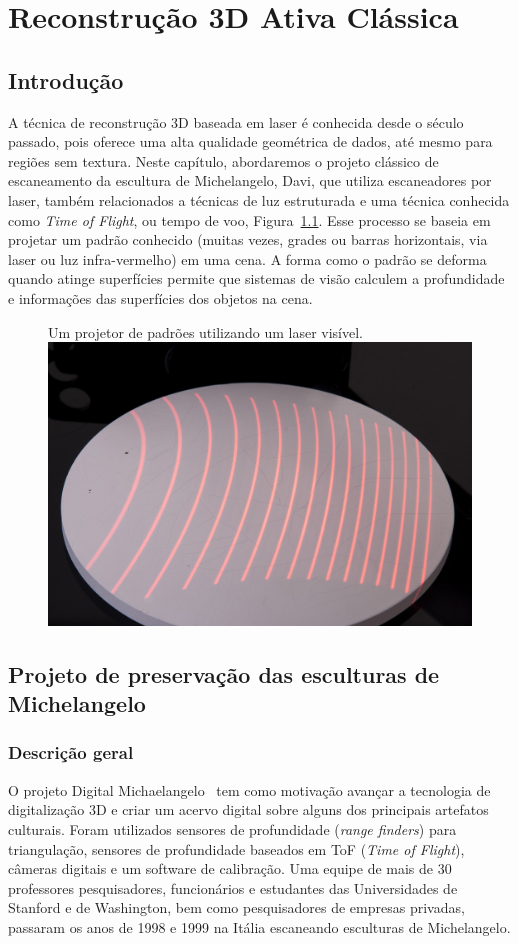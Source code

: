 \chapter{Reconstrução 3D Ativa Clássica}\label{cap:laser}

\section{Introdução}

A técnica de reconstrução 3D baseada em laser 
é conhecida desde o século
passado, pois oferece uma alta qualidade geométrica de dados, até mesmo para
regiões sem textura.  Neste capítulo, abordaremos o projeto clássico de escaneamento da
escultura de Michelangelo, Davi, que utiliza escaneadores 
por laser, também relacionados a técnicas de luz estruturada e
uma técnica conhecida como \emph{Time of Flight}, ou tempo de voo,
Figura~\ref{fig:luzestruturada}. Esse processo se baseia em projetar um padrão
conhecido (muitas vezes, grades ou barras horizontais, via laser ou luz infra-vermelho) em uma
cena. A forma como o padrão se deforma quando atinge superfícies permite que
sistemas de visão calculem a profundidade e informações das superfícies dos
objetos na cena.

\begin{figure}[!h]
	\centering
	\caption{%
		Um projetor de padrões utilizando um laser visível.
	\includegraphics[width=0.4\linewidth]{figs/luzestruturada.jpg}
	}
	\label{fig:luzestruturada}
\end{figure}

\section{Projeto de preservação das esculturas de Michelangelo}\label{sec:David}

\subsection{Descrição geral}

O projeto Digital Michaelangelo~\cite{levoy2000digital} tem como motivação
avançar a tecnologia de digitalização 3D e criar um acervo digital sobre alguns
dos principais artefatos culturais. Foram
utilizados sensores de profundidade (\emph{range finders}) para triangulação,
sensores de profundidade baseados em ToF (\emph{Time of Flight}), câmeras digitais e
um software de calibração. Uma equipe de mais de 30 professores pesquisadores,
funcionários e estudantes das Universidades de Stanford e de Washington, bem como pesquisadores de 
empresas privadas, passaram os anos de 1998 e
1999 na Itália escaneando esculturas de Michelangelo. 

